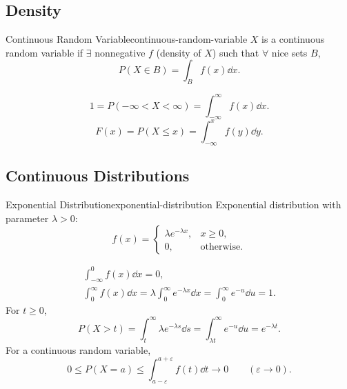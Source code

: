 \subsection{Density}

\begin{definition}{Continuous Random Variable}{continuous-random-variable}
  $X$ is a continuous random variable if $\exists$ nonnegative $f$ (density of $X$)
  such that $\forall$ nice sets $B$,
  \[
    P(X\in B)=\int_B f(x)\dd{x}.
  \]
\end{definition}

\[
  1=P(-\infty<X<\infty)=\int_{-\infty}^{\infty}f(x)\dd{x}.
\]
\[
  F(x)=P(X\le x)=\int_{-\infty}^x f(y)\dd{y}.
\]

\subsection{Continuous Distributions}

\begin{definition}{Exponential Distribution}{exponential-distribution}
  Exponential distribution with parameter $\lambda>0$:
  \[
    f(x)=
    \begin{cases}
      \lambda e^{-\lambda x}, & x\ge0,            \\
      0,                      & \text{otherwise}.
    \end{cases}
  \]
\end{definition}

\begin{center}
\end{center}

\begin{gather*}
  \int_{-\infty}^0 f(x)\dd{x}=0,\\
  \int_0^{\infty}f(x)\dd{x}
  =\lambda\int_0^{\infty}e^{-\lambda x}\dd{x}
  =\int_0^{\infty}e^{-u}\dd{u}=1.
\end{gather*}
For $t\ge0$,
\[
  P(X>t)=\int_t^{\infty}\lambda e^{-\lambda s}\dd{s}
  =\int_{\lambda t}^{\infty}e^{-u}\dd{u}=e^{-\lambda t}.
\]
For a continuous random variable,
\[
  0\le P(X=a)\le\int_{a-\varepsilon}^{a+\varepsilon}f(t)\dd{t}
  \longrightarrow0\qquad(\varepsilon\to0).
\]

